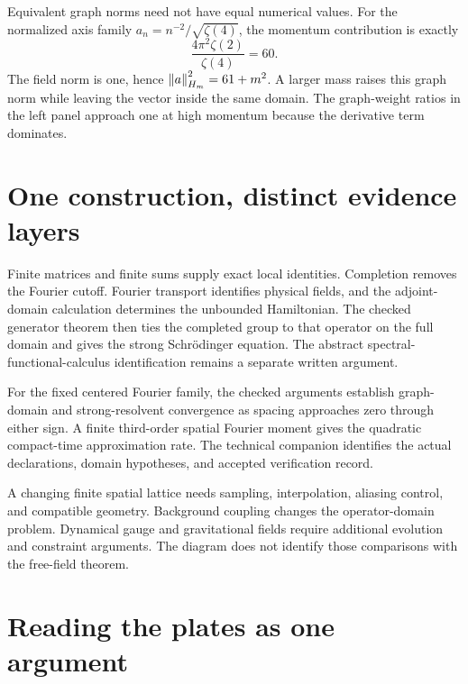 Equivalent graph norms need not have equal numerical values. For the normalized axis family $a_n=n^{-2}/\sqrt{\zeta(4)}$, the momentum contribution is exactly
\[
\frac{4\pi^2\zeta(2)}{\zeta(4)}=60.
\]
The field norm is one, hence $\left\lVert a\right\rVert_{H_m}^2=61+m^2$. A larger mass raises this graph norm while leaving the vector inside the same domain. The graph-weight ratios in the left panel approach one at high momentum because the derivative term dominates.


\clearpage
\section{One construction, distinct evidence layers}

Finite matrices and finite sums supply exact local identities. Completion removes the Fourier cutoff. Fourier transport identifies physical fields, and the adjoint-domain calculation determines the unbounded Hamiltonian. The checked generator theorem then ties the completed group to that operator on the full domain and gives the strong Schrödinger equation. The abstract spectral-functional-calculus identification remains a separate written argument.

For the fixed centered Fourier family, the checked arguments establish graph-domain and strong-resolvent convergence as spacing approaches zero through either sign. A finite third-order spatial Fourier moment gives the quadratic compact-time approximation rate. The technical companion identifies the actual declarations, domain hypotheses, and accepted verification record.

A changing finite spatial lattice needs sampling, interpolation, aliasing control, and compatible geometry. Background coupling changes the operator-domain problem. Dynamical gauge and gravitational fields require additional evolution and constraint arguments. The diagram does not identify those comparisons with the free-field theorem.

\clearpage
\section{Reading the plates as one argument}

